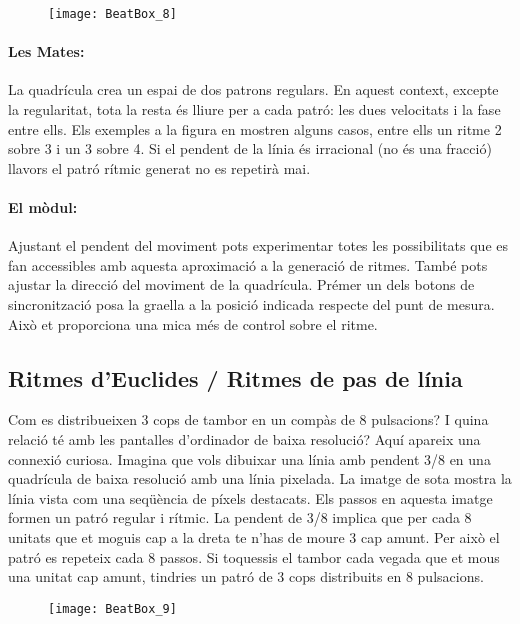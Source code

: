 \begin{figure}[h]
\centering
\texttt{[image: BeatBox\_8]}
\end{figure}

\paragraph{Les Mates:} La quadrícula crea un espai de dos patrons regulars. En aquest context, excepte la regularitat, tota la resta és lliure per a cada patró: les dues velocitats i la fase entre ells. Els exemples a la figura en mostren alguns casos, entre ells un ritme 2 sobre 3 i un 3 sobre 4. Si el pendent de la línia és irracional (no és una fracció) llavors el patró rítmic generat no es repetirà mai.

\paragraph{El mòdul:}
Ajustant el pendent del moviment pots experimentar totes les possibilitats que es fan accessibles amb aquesta aproximació a la generació de ritmes. També pots ajustar la direcció del moviment de la quadrícula. Prémer un dels botons de sincronització posa la graella a la posició indicada respecte del punt de mesura. Això et proporciona una mica més de control sobre el ritme.

\subsection{Ritmes d'Euclides / Ritmes de pas de línia}
Com es distribueixen 3 cops de tambor en un compàs de 8 pulsacions? I quina relació té amb les pantalles d'ordinador de baixa resolució? Aquí apareix una connexió curiosa. Imagina que vols dibuixar una línia amb pendent 3/8 en una quadrícula de baixa resolució amb una línia pixelada. La imatge de sota mostra la línia vista com una seqüència de píxels destacats. Els passos en aquesta imatge formen un patró regular i rítmic. La pendent de 3/8 implica que per cada 8 unitats que et moguis cap a la dreta te n'has de moure 3 cap amunt. Per això el patró es repeteix cada 8 passos. Si toquessis el tambor cada vegada que et mous una unitat cap amunt, tindries un patró de 3 cops distribuits en 8 pulsacions.

\begin{figure}[h]
\centering
\texttt{[image: BeatBox\_9]}
\end{figure}

